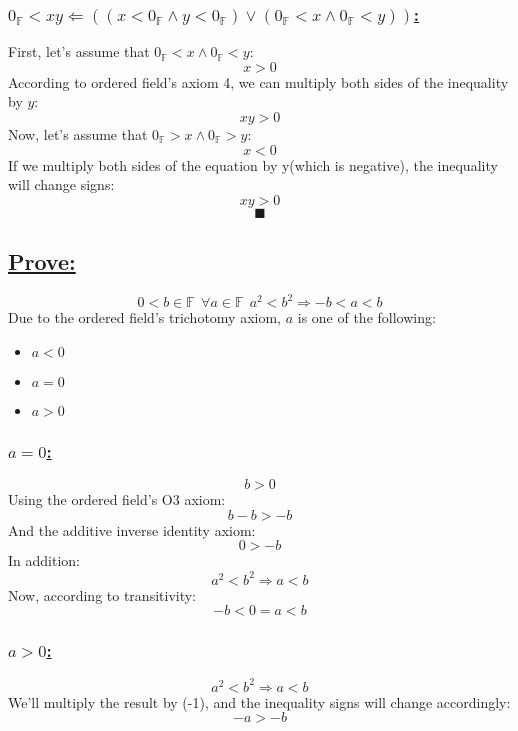 \documentclass[a4paper, 12pt]{article}
\newcommand{\sub}[1]{\subsection{\underline{#1}}}
\newcommand{\subsub}[1]{\subsubsection{\underline{#1}}}
\newcommand{\?}{\stackrel{?}{=}}
\newcommand{\F}{\ensuremath{\mathbb{F}}}
\renewcommand{\qed}{$$\blacksquare$$}
\begin{document}
\subsub{$ 0_{\F}<xy \Longleftarrow ((x<0_{\F} \land y<0_{\F}) \lor (0_{\F} < x \land 0_{\F}<y))$:}
First, let's assume that $0_{\F} < x \land 0_{\F}<y$: $$x > 0 $$
According to ordered field's axiom 4, we can multiply both sides of the inequality by $y$: $$ xy > 0 $$
Now, let's assume that $0_{\F} > x \land 0_{\F}>y $: $$x < 0 $$
If we multiply both sides of the equation by y(which is negative), the inequality will change signs: $$ xy > 0 $$
\qed\pagebreak

\sub{Prove:}
$$ 0<b\in{\F}~~\forall{a}\in{\F}~~a^2<b^2 \Longrightarrow -b<a<b $$
Due to the ordered field's trichotomy axiom, $a$ is one of the following:
\begin{itemize}
    \item $a<0$
    \item $a=0$
    \item $a>0$
\end{itemize}

\subsub{$a=0$:}
$$ b>0 $$
Using the ordered field's O3 axiom: $$ b-b > -b $$
And the additive inverse identity axiom: $$ 0 > -b $$
In addition: $$ a^2<b^2 \Longrightarrow a<b $$
Now, according to transitivity: $$ -b < 0 = a < b $$

\subsub{$a>0$:}
$$ a^2<b^2 \Longrightarrow a<b $$
We'll multiply the result by (-1), and the inequality signs will change accordingly:
$$ -a>-b $$


\end{document}
